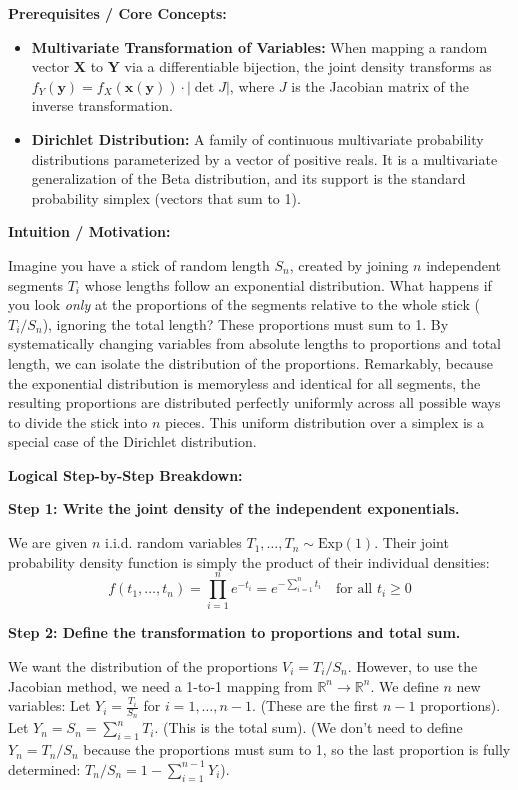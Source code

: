 \begin{solution}
\textbf{Prerequisites / Core Concepts:}
\begin{itemize}
    \item \textbf{Multivariate Transformation of Variables:} When mapping a random vector $\mathbf{X}$ to $\mathbf{Y}$ via a differentiable bijection, the joint density transforms as $f_Y(\mathbf{y}) = f_X(\mathbf{x}(\mathbf{y})) \cdot |\det J|$, where $J$ is the Jacobian matrix of the inverse transformation.
    \item \textbf{Dirichlet Distribution:} A family of continuous multivariate probability distributions parameterized by a vector of positive reals. It is a multivariate generalization of the Beta distribution, and its support is the standard probability simplex (vectors that sum to 1).
\end{itemize}

\textbf{Intuition / Motivation:}

Imagine you have a stick of random length $S_n$, created by joining $n$ independent segments $T_i$ whose lengths follow an exponential distribution. What happens if you look \textit{only} at the proportions of the segments relative to the whole stick ($T_i / S_n$), ignoring the total length? These proportions must sum to 1. By systematically changing variables from absolute lengths to proportions and total length, we can isolate the distribution of the proportions. Remarkably, because the exponential distribution is memoryless and identical for all segments, the resulting proportions are distributed perfectly uniformly across all possible ways to divide the stick into $n$ pieces. This uniform distribution over a simplex is a special case of the Dirichlet distribution.

\textbf{Logical Step-by-Step Breakdown:}

\textbf{Step 1: Write the joint density of the independent exponentials.}

We are given $n$ i.i.d. random variables $T_1, \dots, T_n \sim \text{Exp}(1)$.
Their joint probability density function is simply the product of their individual densities:
\[ f(t_1, \dots, t_n) = \prod_{i=1}^n e^{-t_i} = e^{-\sum_{i=1}^n t_i} \quad \text{for all } t_i \geq 0 \]

\textbf{Step 2: Define the transformation to proportions and total sum.}

We want the distribution of the proportions $V_i = T_i / S_n$. However, to use the Jacobian method, we need a 1-to-1 mapping from $\mathbb{R}^n \to \mathbb{R}^n$. We define $n$ new variables:
Let $Y_i = \frac{T_i}{S_n}$ for $i = 1, \dots, n-1$. (These are the first $n-1$ proportions).
Let $Y_n = S_n = \sum_{i=1}^n T_i$. (This is the total sum).
(We don't need to define $Y_n = T_n/S_n$ because the proportions must sum to 1, so the last proportion is fully determined: $T_n/S_n = 1 - \sum_{i=1}^{n-1} Y_i$).


\end{solution}
